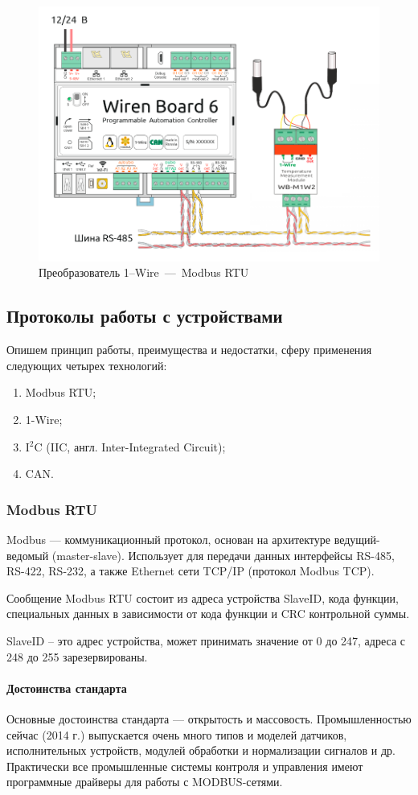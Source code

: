 \documentclass[a4paper,14pt]{extarticle}
\begin{document}
\begin{figure}[h!]
	\centering
	\includegraphics[width=0.5\linewidth]{images/device-3}
	\caption{Преобразователь 1--Wire~—~Modbus RTU}
	\label{fig:device-3}
\end{figure}

\newpage
\subsection{Протоколы работы с устройствами}


Опишем принцип работы, преимущества и недостатки, сферу применения следующих
четырех технологий:
\begin{enumerate}
	\item Modbus RTU;
	\item  1-Wire;
	\item  I${}^2$C (IIC, англ. Inter-Integrated Circuit);
	\item  CAN.
\end{enumerate}

\subsubsection*{Modbus RTU}

Modbus --- коммуникационный протокол, основан на архитектуре ведущий-ведомый (master-slave). Использует для передачи данных интерфейсы RS-485, RS-422, RS-232, а также Ethernet сети TCP/IP (протокол Modbus TCP).

Сообщение Modbus RTU состоит из адреса устройства SlaveID, кода функции, специальных данных в зависимости от кода функции и CRC контрольной суммы.

SlaveID – это адрес устройства, может принимать значение от 0 до 247, адреса с 248 до 255 зарезервированы.

\paragraph*{Достоинства стандарта}
Основные достоинства стандарта — открытость и массовость. Промышленностью сейчас (2014 г.) выпускается очень много типов и моделей датчиков, исполнительных устройств, модулей обработки и нормализации сигналов и др. Практически все промышленные системы контроля и управления имеют программные драйверы для работы с MODBUS-сетями.
\end{document}
